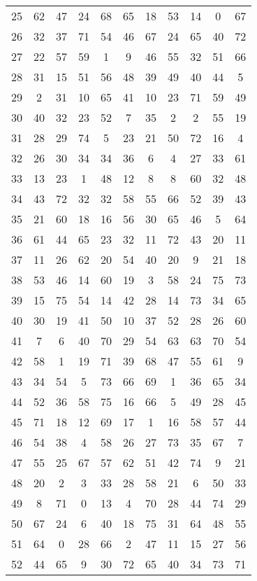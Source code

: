 \begin{table}
\begin{tabular}{c c c c c c c c c c c }
25 & 62 & 47 & 24 & 68 & 65 & 18 & 53 & 14 & 0 & 67 \\
26 & 32 & 37 & 71 & 54 & 46 & 67 & 24 & 65 & 40 & 72 \\
27 & 22 & 57 & 59 & 1 & 9 & 46 & 55 & 32 & 51 & 66 \\
28 & 31 & 15 & 51 & 56 & 48 & 39 & 49 & 40 & 44 & 5 \\
29 & 2 & 31 & 10 & 65 & 41 & 10 & 23 & 71 & 59 & 49 \\
30 & 40 & 32 & 23 & 52 & 7 & 35 & 2 & 2 & 55 & 19 \\
31 & 28 & 29 & 74 & 5 & 23 & 21 & 50 & 72 & 16 & 4 \\
32 & 26 & 30 & 34 & 34 & 36 & 6 & 4 & 27 & 33 & 61 \\
33 & 13 & 23 & 1 & 48 & 12 & 8 & 8 & 60 & 32 & 48 \\
34 & 43 & 72 & 32 & 32 & 58 & 55 & 66 & 52 & 39 & 43 \\
35 & 21 & 60 & 18 & 16 & 56 & 30 & 65 & 46 & 5 & 64 \\
36 & 61 & 44 & 65 & 23 & 32 & 11 & 72 & 43 & 20 & 11 \\
37 & 11 & 26 & 62 & 20 & 54 & 40 & 20 & 9 & 21 & 18 \\
38 & 53 & 46 & 14 & 60 & 19 & 3 & 58 & 24 & 75 & 73 \\
39 & 15 & 75 & 54 & 14 & 42 & 28 & 14 & 73 & 34 & 65 \\
40 & 30 & 19 & 41 & 50 & 10 & 37 & 52 & 28 & 26 & 60 \\
41 & 7 & 6 & 40 & 70 & 29 & 54 & 63 & 63 & 70 & 54 \\
42 & 58 & 1 & 19 & 71 & 39 & 68 & 47 & 55 & 61 & 9 \\
43 & 34 & 54 & 5 & 73 & 66 & 69 & 1 & 36 & 65 & 34 \\
44 & 52 & 36 & 58 & 75 & 16 & 66 & 5 & 49 & 28 & 45 \\
45 & 71 & 18 & 12 & 69 & 17 & 1 & 16 & 58 & 57 & 44 \\
46 & 54 & 38 & 4 & 58 & 26 & 27 & 73 & 35 & 67 & 7 \\
47 & 55 & 25 & 67 & 57 & 62 & 51 & 42 & 74 & 9 & 21 \\
48 & 20 & 2 & 3 & 33 & 28 & 58 & 21 & 6 & 50 & 33 \\
49 & 8 & 71 & 0 & 13 & 4 & 70 & 28 & 44 & 74 & 29 \\
50 & 67 & 24 & 6 & 40 & 18 & 75 & 31 & 64 & 48 & 55 \\
51 & 64 & 0 & 28 & 66 & 2 & 47 & 11 & 15 & 27 & 56 \\
52 & 44 & 65 & 9 & 30 & 72 & 65 & 40 & 34 & 73 & 71 \\

\end{tabular}
\end{table}
